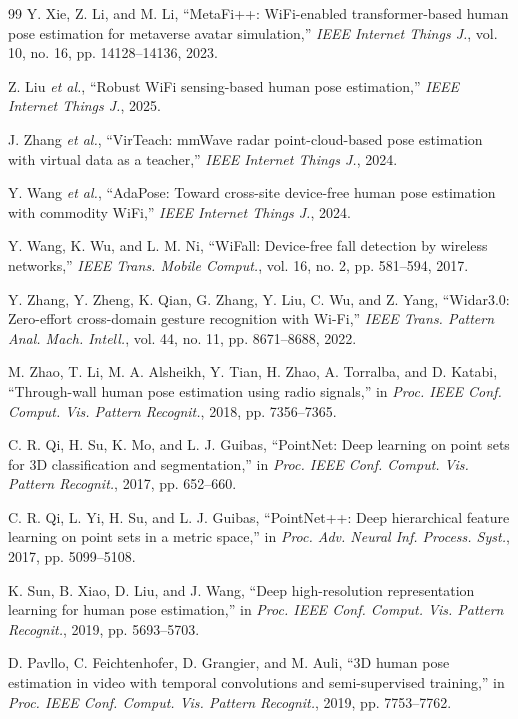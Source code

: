 ﻿\documentclass[UTF8,twocolumn]{ctexart}
\begin{document}
{\begin{thebibliography}{99}
Y. Xie, Z. Li, and M. Li, ``MetaFi++: WiFi-enabled transformer-based human pose estimation for metaverse avatar simulation,'' \emph{IEEE Internet Things J.}, vol. 10, no. 16, pp. 14128--14136, 2023.

Z. Liu \emph{et al.}, ``Robust WiFi sensing-based human pose estimation,'' \emph{IEEE Internet Things J.}, 2025.

J. Zhang \emph{et al.}, ``VirTeach: mmWave radar point-cloud-based pose estimation with virtual data as a teacher,'' \emph{IEEE Internet Things J.}, 2024.

Y. Wang \emph{et al.}, ``AdaPose: Toward cross-site device-free human pose estimation with commodity WiFi,'' \emph{IEEE Internet Things J.}, 2024.

Y. Wang, K. Wu, and L. M. Ni, ``WiFall: Device-free fall detection by wireless networks,'' \emph{IEEE Trans. Mobile Comput.}, vol. 16, no. 2, pp. 581--594, 2017.

Y. Zhang, Y. Zheng, K. Qian, G. Zhang, Y. Liu, C. Wu, and Z. Yang, ``Widar3.0: Zero-effort cross-domain gesture recognition with Wi-Fi,'' \emph{IEEE Trans. Pattern Anal. Mach. Intell.}, vol. 44, no. 11, pp. 8671--8688, 2022.

M. Zhao, T. Li, M. A. Alsheikh, Y. Tian, H. Zhao, A. Torralba, and D. Katabi, ``Through-wall human pose estimation using radio signals,'' in \emph{Proc. IEEE Conf. Comput. Vis. Pattern Recognit.}, 2018, pp. 7356--7365.

C. R. Qi, H. Su, K. Mo, and L. J. Guibas, ``PointNet: Deep learning on point sets for 3D classification and segmentation,'' in \emph{Proc. IEEE Conf. Comput. Vis. Pattern Recognit.}, 2017, pp. 652--660.

C. R. Qi, L. Yi, H. Su, and L. J. Guibas, ``PointNet++: Deep hierarchical feature learning on point sets in a metric space,'' in \emph{Proc. Adv. Neural Inf. Process. Syst.}, 2017, pp. 5099--5108.

K. Sun, B. Xiao, D. Liu, and J. Wang, ``Deep high-resolution representation learning for human pose estimation,'' in \emph{Proc. IEEE Conf. Comput. Vis. Pattern Recognit.}, 2019, pp. 5693--5703.

D. Pavllo, C. Feichtenhofer, D. Grangier, and M. Auli, ``3D human pose estimation in video with temporal convolutions and semi-supervised training,'' in \emph{Proc. IEEE Conf. Comput. Vis. Pattern Recognit.}, 2019, pp. 7753--7762.


\end{thebibliography}}
\end{document}
